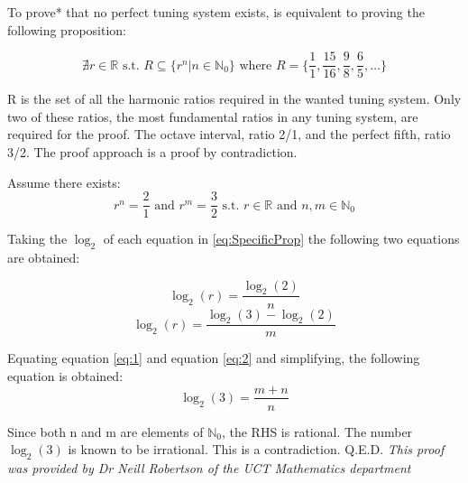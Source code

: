 
To prove* that no perfect tuning system exists, is equivalent to proving the
following proposition:

\begin{equation}\label{eq:GeneralProp}
	\nexists r \in \mathbb{R} \text{ s.t. }
	R \subseteq \{ r^n | n \in \mathbb{N}_0 \}
	\text{ where } R = \{ \frac{1}{1}, \frac{15}{16}, \frac{9}{8}, \frac{6}{5}, \dots \}
\end{equation}

R is the set of all the harmonic ratios required in the wanted tuning system. Only
two of these ratios, the most fundamental ratios in any tuning system, are
required for the proof. The octave interval, ratio 2/1, and the perfect fifth, ratio
3/2. The proof approach is a proof by contradiction.

Assume there exists:
\begin{equation}\label{eq:SpecificProp}
	r^n = \frac{2}{1} \text{ and } r^m = \frac{3}{2}
	\text{ s.t. }
	r \in \mathbb{R} \text{ and } n,m \in \mathbb{N}_0
\end{equation}

Taking the $\log_{2}$ of each equation in \ref{eq:SpecificProp} the following two
equations are obtained:

\begin{equation}\label{eq:1}
	\log_{2}(r) = \frac{\log_{2}(2)}{n}
\end{equation}
\begin{equation}\label{eq:2}
	\log_{2}(r) = \frac{\log_{2}(3) - \log_{2}(2)}{m}
\end{equation}

Equating equation \ref{eq:1} and equation \ref{eq:2} and simplifying, the following
equation is obtained:
\begin{equation}\label{eq:2}
	\log_{2}(3) = \frac{m+n}{n}
\end{equation}

Since both n and m are elements of $\mathbb{N}_0$, the RHS is rational.
The number $\log_{2}(3)$ is known to be irrational. This is a contradiction. Q.E.D.
\vfill
{\it *This proof was provided by Dr Neill Robertson of the UCT
Mathematics department}
